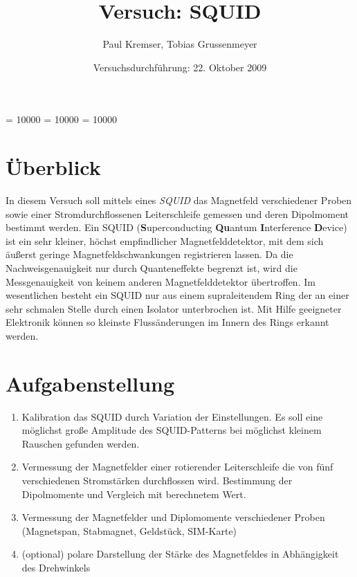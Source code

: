 \documentclass[12pt]{article}
\newcommand{\changefont}[3]{
\fontfamily{#1} \fontseries{#2} \fontshape{#3} \selectfont}
\begin{document}
\clubpenalty = 10000
\widowpenalty = 10000 
\displaywidowpenalty = 10000

\onehalfspacing
\changefont{ptm}{m}{n} 

\begin{titlepage}
\author{Paul Kremser, Tobias Grussenmeyer}
\title{Versuch: SQUID}
\date{Versuchsdurchführung: 22. Oktober 2009} 
\maketitle
\thispagestyle{empty}
\end{titlepage}


\tableofcontents
\thispagestyle{empty}
\newpage
{}
\section{Überblick}
In diesem Versuch soll mittels eines \textit{SQUID} das Magnetfeld verschiedener Proben sowie einer Stromdurchflossenen Leiterschleife gemessen und deren Dipolmoment bestimmt werden. Ein SQUID (\textbf{S}uper\-conducting \textbf{Qu}antum \textbf{I}nterference \textbf{D}evice) ist ein sehr kleiner, höchst empfindlicher Magnetfelddetektor, mit dem sich äußerst geringe Magnetfeldschwankungen registrieren lassen. Da die Nachweisgenauigkeit nur durch Quanteneffekte begrenzt ist, wird die Messgenauigkeit von keinem anderen Magnetfelddetektor übertroffen. Im wesentlichen besteht ein SQUID nur aus einem supraleitendem Ring der an einer sehr schmalen Stelle durch einen Isolator unterbrochen ist. Mit Hilfe geeigneter Elektronik können so kleinste Flussänderungen im Innern des Rings erkannt werden.

\section{Aufgabenstellung}
\begin{enumerate}
 \item Kalibration das SQUID durch Variation der Einstellungen. Es soll eine möglichst große Amplitude des SQUID-Patterns bei möglichst kleinem Rauschen gefunden werden.
\item Vermessung der Magnetfelder einer rotierender Leiterschleife die von fünf verschiedenen Stromstärken durchflossen wird. Bestimmung der Dipolmomente und Vergleich mit berechnetem Wert.
\item Vermessung der Magnetfelder und Diplomomente verschiedener Proben (Magnetspan, Stabmagnet, Geldstück, SIM-Karte)
\item (optional) polare Darstellung der Stärke des Magnetfeldes in Abhängigkeit des Drehwinkels
\end{enumerate}
\newpage
\end{document}
